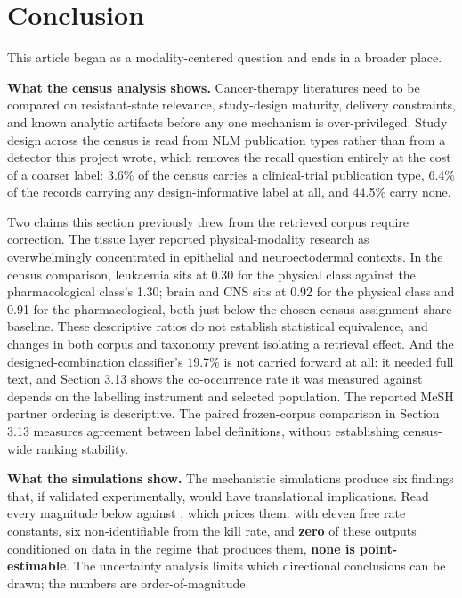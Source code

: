 \documentclass[11pt,twoside,openright]{report}
\begin{document}

\section{Conclusion}

This article began as a modality-centered question and ends in a broader place.

\textbf{What the census analysis shows.} Cancer-therapy literatures need to be compared on resistant-state relevance, study-design maturity, delivery constraints, and known analytic artifacts before any one mechanism is over-privileged. Study design across the census is read from NLM publication types rather than from a detector this project wrote, which removes the recall question entirely at the cost of a coarser label: 3.6\% of the census carries a clinical-trial publication type, 6.4\% of the records carrying any design-informative label at all, and 44.5\% carry none.

Two claims this section previously drew from the retrieved corpus require correction. The tissue layer reported physical-modality research as overwhelmingly concentrated in epithelial and neuroectodermal contexts. In the census comparison, leukaemia sits at 0.30 for the physical class against the pharmacological class's 1.30; brain and CNS sits at 0.92 for the physical class and 0.91 for the pharmacological, both just below the chosen census assignment-share baseline. These descriptive ratios do not establish statistical equivalence, and changes in both corpus and taxonomy prevent isolating a retrieval effect. And the designed-combination classifier's 19.7\% is not carried forward at all: it needed full text, and Section 3.13 shows the co-occurrence rate it was measured against depends on the labelling instrument and selected population. The reported MeSH partner ordering is descriptive. The paired frozen-corpus comparison in Section 3.13 measures agreement between label definitions, without establishing census-wide ranking stability.

\textbf{What the simulations show.} The mechanistic simulations produce six findings that, if validated experimentally, would have translational implications. Read every magnitude below against , which prices them: with eleven free rate constants, six non-identifiable from the kill rate, and \textbf{zero} of these outputs conditioned on data in the regime that produces them, \textbf{none is point-estimable}. The uncertainty analysis limits which directional conclusions can be drawn; the numbers are order-of-magnitude.
\end{document}
